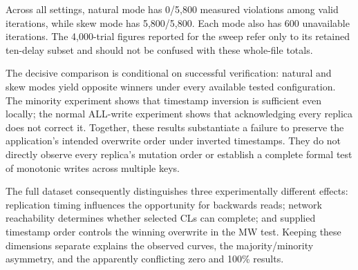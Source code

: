 Across all settings, natural mode has 0/5,800 measured violations among valid iterations, while skew mode has 5,800/5,800. Each mode also has 600 unavailable iterations. The 4,000-trial figures reported for the sweep refer only to its retained ten-delay subset and should not be confused with these whole-file totals.

The decisive comparison is conditional on successful verification: natural and skew modes yield opposite winners under every available tested configuration. The minority experiment shows that timestamp inversion is sufficient even locally; the normal ALL-write experiment shows that acknowledging every replica does not correct it. Together, these results substantiate a failure to preserve the application's intended overwrite order under inverted timestamps. They do not directly observe every replica's mutation order or establish a complete formal test of monotonic writes across multiple keys.

The full dataset consequently distinguishes three experimentally different effects: replication timing influences the opportunity for backwards reads; network reachability determines whether selected CLs can complete; and supplied timestamp order controls the winning overwrite in the MW test. Keeping these dimensions separate explains the observed curves, the majority/minority asymmetry, and the apparently conflicting zero and 100\% results.
